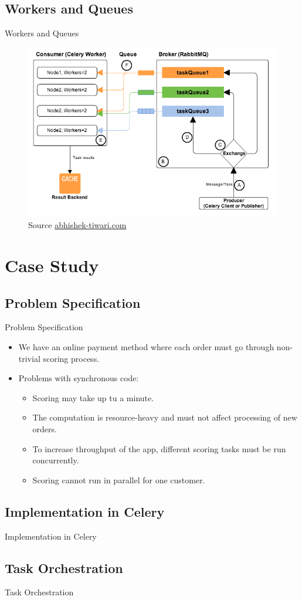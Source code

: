 \documentclass[xcolor=x11names,compress,t]{beamer}
\renewcommand{\(}{\begin{columns}[T]}
\renewcommand{\)}{\end{columns}}
\newcommand{\<}[1]{\begin{column}{#1}}
\renewcommand{\>}{\end{column}}
\newenvironment{slide}[1]{\subsection{#1} \begin{frame}{#1}}{\end{frame}}
\begin{document}
\begin{slide}{Workers and Queues}
    \begin{figure}
        \includegraphics[scale=0.45]{celery-queues-and-workers}
        \caption{Source \href{https://abhishek-tiwari.com/post/amqp-rabbitmq-and-celery-a-visual-guide-for-dummies}{abhishek-tiwari.com}}
    \end{figure}
\end{slide} 

\section{Case Study} 
\begin{slide}{Problem Specification}
    \begin{itemize}
        \item We have an online payment method where each order must go through non-trivial scoring process.
        \item Problems with synchronous code:
        \begin{itemize}
            \item Scoring may take up tu a minute.
            \item The computation is resource-heavy and must not affect processing of new orders.
            \item To increase throughput of the app, different scoring tasks must be run concurrently.
            \item Scoring cannot run in parallel for one customer.
        \end{itemize}
    \end{itemize}
\end{slide}

\begin{slide}{Implementation in Celery}

\end{slide}

\begin{slide}{Task Orchestration}
\end{slide} 
\end{document}

